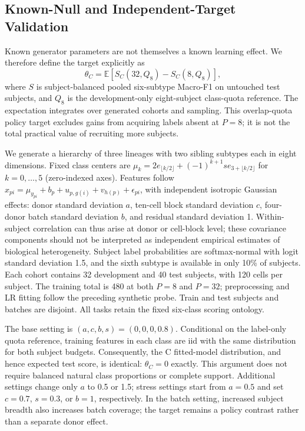 \subsection{Known-Null and Independent-Target Validation}
\label{sec:appendix:known_target}

Known generator parameters are not themselves a known learning effect.
We therefore define the target explicitly as
\begin{equation}
\theta_C=\mathbb{E}\!\left[S_C(32,Q_8)-S_C(8,Q_8)\right],
\end{equation}
where $S$ is subject-balanced pooled six-subtype Macro-F1 on untouched test
subjects, and $Q_8$ is the development-only eight-subject class-quota reference.
The expectation integrates over generated cohorts and sampling. This
overlap-quota policy target excludes gains from acquiring labels absent at
$P=8$; it is not the total practical value of recruiting more subjects.

We generate a hierarchy of three lineages with two sibling subtypes each in
eight dimensions. Fixed class centers are $\mu_k=2e_{\lfloor k/2\rfloor}
+(-1)^{k+1}s e_{3+\lfloor k/2\rfloor}$ for $k=0,\ldots,5$ (zero-indexed axes).
Features follow $x_{pi}=\mu_{y_{pi}}+b_p+u_{p,g(i)}+v_{h(p)}+\epsilon_{pi}$,
with independent isotropic Gaussian effects: donor standard deviation $a$,
ten-cell block standard deviation $c$, four-donor batch standard deviation
$b$, and residual standard deviation 1. Within-subject correlation can thus
arise at donor or cell-block level; these covariance components should not be
interpreted as independent empirical estimates of biological heterogeneity.
Subject label probabilities are softmax-normal with logit standard deviation
1.5, and the sixth subtype is available in only 10\% of subjects. Each cohort
contains 32 development and 40 test subjects, with 120 cells per subject.
The training total is 480 at both $P=8$ and $P=32$; preprocessing and LR fitting
follow the preceding synthetic probe. Train and test subjects and batches are
disjoint. All tasks retain the fixed six-class scoring ontology.

The base setting is $(a,c,b,s)=(0,0,0,0.8)$. Conditional on the label-only
quota reference, training features in each class are iid with the same
distribution for both subject budgets. Consequently, the C fitted-model
distribution, and hence expected test score, is identical: $\theta_C=0$
exactly. This argument does not require balanced natural class proportions or
complete support. Additional settings change only $a$ to 0.5 or 1.5; stress
settings start from $a=0.5$ and set $c=0.7$, $s=0.3$, or $b=1$, respectively.
In the batch setting, increased subject breadth also increases batch coverage;
the target remains a policy contrast rather than a separate donor effect.

